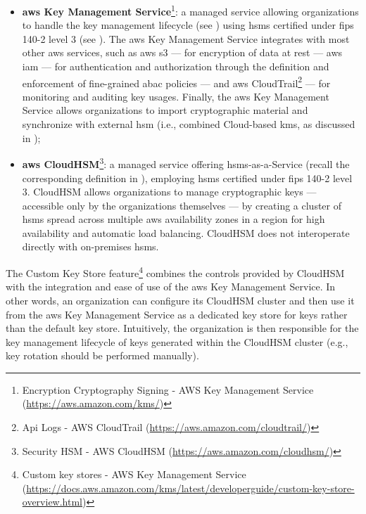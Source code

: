 \begin{itemize}
	\item \textbf{\gls{aws} Key Management Service}\footnote{Encryption Cryptography Signing - AWS Key Management Service (\url{https://aws.amazon.com/kms/})}: a managed service allowing organizations to handle the key management lifecycle (see ) using \glspl{hsm} certified under \gls{fips} 140-2 level 3 (see ). The \gls{aws} Key Management Service integrates with most other \gls{aws} services, such as \gls{aws} \gls{s3} --- for encryption of data at rest --- \gls{aws} \gls{iam} --- for authentication and authorization through the definition and enforcement of fine-grained \gls{abac} policies --- and \gls{aws} CloudTrail\footnote{Api Logs - AWS CloudTrail (\url{https://aws.amazon.com/cloudtrail/})} --- for monitoring and auditing key usages. Finally, the \gls{aws} Key Management Service allows organizations to import cryptographic material and synchronize with external \gls{hsm} (i.e., combined Cloud-based \gls{kms}, as discussed in );
	\item \textbf{\gls{aws} CloudHSM}\footnote{Security HSM - AWS CloudHSM (\url{https://aws.amazon.com/cloudhsm/})}: a managed service offering \glspl{hsm}-as-a-Service (recall the corresponding definition in ), employing \glspl{hsm} certified under \gls{fips} 140-2 level 3. CloudHSM allows organizations to manage cryptographic keys --- accessible only by the organizations themselves --- by creating a cluster of \glspl{hsm} spread across multiple \gls{aws} availability zones in a region for high availability and automatic load balancing. CloudHSM does not interoperate directly with on-premises \glspl{hsm}.
\end{itemize}

The Custom Key Store feature\footnote{Custom key stores - AWS Key Management Service (\url{https://docs.aws.amazon.com/kms/latest/developerguide/custom-key-store-overview.html})} combines the controls provided by CloudHSM with the integration and ease of use of the \gls{aws} Key Management Service. In other words, an organization can configure its CloudHSM cluster and then use it from the \gls{aws} Key Management Service as a dedicated key store for keys rather than the default key store. Intuitively, the organization is then responsible for the key management lifecycle of keys generated within the CloudHSM cluster (e.g., key rotation should be performed manually).


